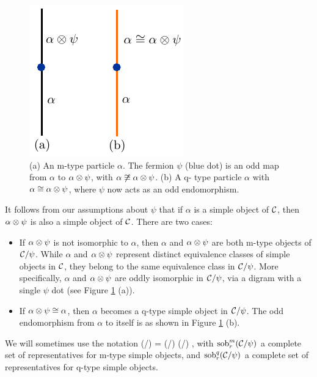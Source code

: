 \medskip

\begin{figure}
\begin{center}
\includegraphics{mvsqtype.pdf}
\caption{ \label{mvsqtype} (a) An m-type particle $\alpha$. The fermion $\psi$ (blue dot) is 
an odd map from $\alpha$ to $\alpha\otimes \psi$, with $\alpha\not\cong\alpha\otimes\psi$. (b) A q-
type particle $\alpha$ with $\alpha\cong\alpha\otimes\psi$, where $\psi$ now acts as an odd 
endomorphism.
}
\end{center}
\end{figure} 

It follows from our assumptions about $\psi$ that if $\alpha$ is a simple object of $\mathcal{C}$, then
$\alpha\otimes\psi$ is also a simple object of $\mathcal{C}$.
There are two cases:
\begin{itemize}
	\item If $\alpha\otimes\psi$ is not isomorphic to $\alpha$, then $\alpha$ and $\alpha\otimes\psi$ are both m-type
	objects of $\mathcal{C}/\psi$.
	While $\alpha$ and $\alpha\otimes\psi$ represent distinct equivalence classes of simple objects in $\mathcal{C}$,
	they belong to the same equivalence class in $\mathcal{C}/
	\psi$.
	More specifically, $\alpha$ and $\alpha\otimes\psi$ are oddly isomorphic in $\mathcal{C}/\psi$, 
	via a digram with a single $\psi$ dot (see Figure \ref{mvsqtype} (a)).
	\item If $\alpha\otimes\psi \cong \alpha$, then $\alpha$ becomes a q-type simple object in $\mathcal{C}/\psi$.
	The odd endomorphism from $\alpha$ to itself is as shown in Figure \ref{mvsqtype} (b).
\end{itemize}

We will sometimes use the notation
\be
	\sob(\mcc/\psi) = \sobm(\mcc/\psi) \du \sobq(\mcc/\psi) ,
\ee
with $\text{sob}_r^m(\mathcal{C}/\psi)$ a complete set of representatives for m-type simple objects, and
$\text{sob}_r^q(\mathcal{C}/\psi)$ a complete set of representatives for q-type simple objects.

